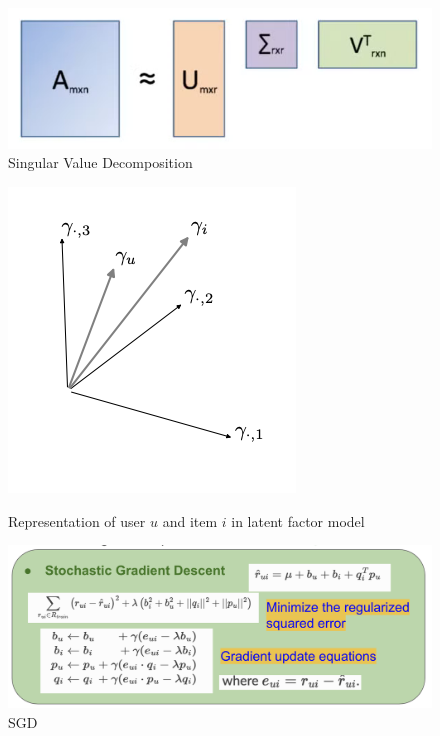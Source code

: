\documentclass{article}
\begin{document}
\begin{figure}[h]
    \centering
    \includegraphics[width=0.75\linewidth]{images/image2.png}
    \caption{Singular Value Decomposition}
    \label{fig:svd}
\end{figure}

\begin{figure}[h]
\centering
\begin{minipage}{.3\textwidth}
  \centering
  \includegraphics[width=.9\linewidth]{DSC210_Project_Report/images/ui_vectors.png}
  \caption{Representation of user $u$ and item $i$ in latent factor model}
  \label{fig:ui_vectors}
\end{minipage}%
\begin{minipage}{.7\textwidth}
  \centering
  \includegraphics[width=.9\linewidth]{DSC210_Project_Report/images/sgd.png}
  \caption{SGD}
  \label{fig:sgd}
\end{minipage}
\end{figure}
\end{document}
